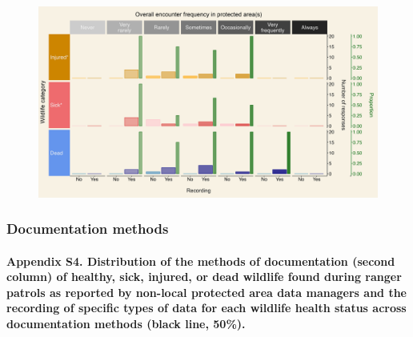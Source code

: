 \documentclass[
  letterpaper,
  DIV=11,
  numbers=noendperiod]{scrartcl}
\let\oldparagraph\paragraph
\renewcommand{\paragraph}[1]{\oldparagraph{#1}\mbox{}}
\begin{document}
\begin{figure}[H]

{\centering \includegraphics[width=6.25in,height=\textheight]{plots/appedix_plot_2.png}

}

\end{figure}

\newpage

\hypertarget{documentation-methods}{%
\subsubsection{Documentation methods}\label{documentation-methods}}

\hypertarget{appendix-s4.-distribution-of-the-methods-of-documentation-second-column-of-healthy-sick-injured-or-dead-wildlife-found-during-ranger-patrols-as-reported-by-non-local-protected-area-data-managers-and-the-recording-of-specific-types-of-data-for-each-wildlife-health-status-across-documentation-methods-black-line-50.}{%
\paragraph{Appendix S4. Distribution of the methods of documentation
(second column) of healthy, sick, injured, or dead wildlife found during
ranger patrols as reported by non-local protected area data managers and
the recording of specific types of data for each wildlife health status
across documentation methods (black line,
50\%).}\label{appendix-s4.-distribution-of-the-methods-of-documentation-second-column-of-healthy-sick-injured-or-dead-wildlife-found-during-ranger-patrols-as-reported-by-non-local-protected-area-data-managers-and-the-recording-of-specific-types-of-data-for-each-wildlife-health-status-across-documentation-methods-black-line-50.}}
\end{document}
